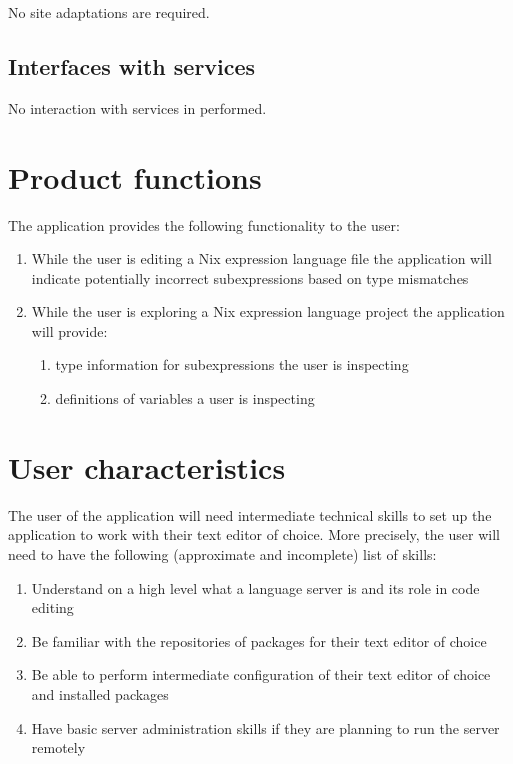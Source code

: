 \documentclass[12pt]{article}
\newcounter{req}
\begin{document}
No site adaptations are required.

\subsection{Interfaces with services}

No interaction with services in performed.

\section{Product functions}

The application provides the following functionality to the user:

\begin{enumerate}
  \item While the user is editing a Nix expression language file the application will indicate potentially incorrect subexpressions based on type mismatches
  \item While the user is exploring a Nix expression language project the application will provide:
        \begin{enumerate}
          \item type information for subexpressions the user is inspecting
          \item definitions of variables a user is inspecting
        \end{enumerate}
\end{enumerate}

\section{User characteristics}

The user of the application will need intermediate technical skills to set up the application to work with their text editor of choice. More precisely, the user will need to have the following (approximate and incomplete) list of skills:

\begin{enumerate}
  \item Understand on a high level what a language server is and its role in code editing
  \item Be familiar with the repositories of packages for their text editor of choice
  \item Be able to perform intermediate configuration of their text editor of choice and installed packages
  \item Have basic server administration skills if they are planning to run the server remotely
\end{enumerate}
\end{document}
